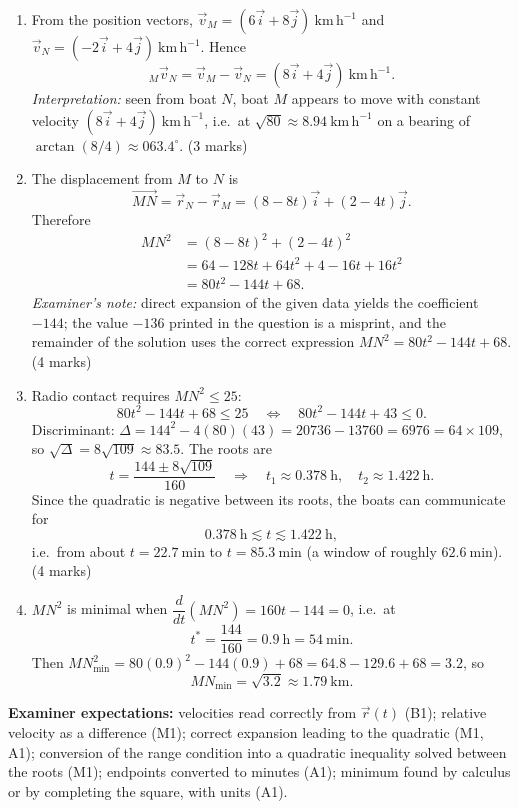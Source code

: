 \documentclass[11pt]{article}
\begin{document}
\begin{corrige}
\begin{enumerate}
\item From the position vectors, $\vec{v}_M = (6\vec{i} + 8\vec{j})\ \mathrm{km\,h^{-1}}$ and $\vec{v}_N = (-2\vec{i} + 4\vec{j})\ \mathrm{km\,h^{-1}}$. Hence
\[
{}_M\vec{v}_N = \vec{v}_M - \vec{v}_N = (8\vec{i} + 4\vec{j})\ \mathrm{km\,h^{-1}}.
\]
\emph{Interpretation:} seen from boat $N$, boat $M$ appears to move with constant velocity $(8\vec{i} + 4\vec{j})\ \mathrm{km\,h^{-1}}$, i.e.\ at $\sqrt{80} \approx 8.94\ \mathrm{km\,h^{-1}}$ on a bearing of $\arctan(8/4) \approx 063.4^{\circ}$. \hfill (3 marks)
\item The displacement from $M$ to $N$ is
\[
\overrightarrow{MN} = \vec{r}_N - \vec{r}_M = (8 - 8t)\vec{i} + (2 - 4t)\vec{j}.
\]
Therefore
\begin{align*}
MN^2 &= (8-8t)^2 + (2-4t)^2 \\
&= 64 - 128t + 64t^2 + 4 - 16t + 16t^2 \\
&= 80t^2 - 144t + 68.
\end{align*}
\emph{Examiner's note:} direct expansion of the given data yields the coefficient $-144$; the value $-136$ printed in the question is a misprint, and the remainder of the solution uses the correct expression $MN^2 = 80t^2 - 144t + 68$. \hfill (4 marks)
\item Radio contact requires $MN^2 \leq 25$:
\[
80t^2 - 144t + 68 \leq 25 \quad\Longleftrightarrow\quad 80t^2 - 144t + 43 \leq 0.
\]
Discriminant: $\Delta = 144^2 - 4(80)(43) = 20736 - 13760 = 6976 = 64 \times 109$, so $\sqrt{\Delta} = 8\sqrt{109} \approx 83.5$. The roots are
\[
t = \frac{144 \pm 8\sqrt{109}}{160} \quad\Longrightarrow\quad t_1 \approx 0.378\ \mathrm{h}, \quad t_2 \approx 1.422\ \mathrm{h}.
\]
Since the quadratic is negative between its roots, the boats can communicate for
\[
0.378\ \mathrm{h} \lesssim t \lesssim 1.422\ \mathrm{h},
\]
i.e.\ from about $t = 22.7\ \mathrm{min}$ to $t = 85.3\ \mathrm{min}$ (a window of roughly $62.6\ \mathrm{min}$). \hfill (4 marks)
\item $MN^2$ is minimal when $\dfrac{d}{dt}(MN^2) = 160t - 144 = 0$, i.e.\ at
\[
t^\ast = \frac{144}{160} = 0.9\ \mathrm{h} = 54\ \mathrm{min}.
\]
Then $MN^2_{\min} = 80(0.9)^2 - 144(0.9) + 68 = 64.8 - 129.6 + 68 = 3.2$, so
\[
MN_{\min} = \sqrt{3.2} \approx 1.79\ \mathrm{km}. \tag{2 marks}
\]
\end{enumerate}
\textbf{Examiner expectations:} velocities read correctly from $\vec{r}(t)$ (B1); relative velocity as a difference (M1); correct expansion leading to the quadratic (M1, A1); conversion of the range condition into a quadratic inequality solved between the roots (M1); endpoints converted to minutes (A1); minimum found by calculus or by completing the square, with units (A1).
\end{corrige}
\end{document}
